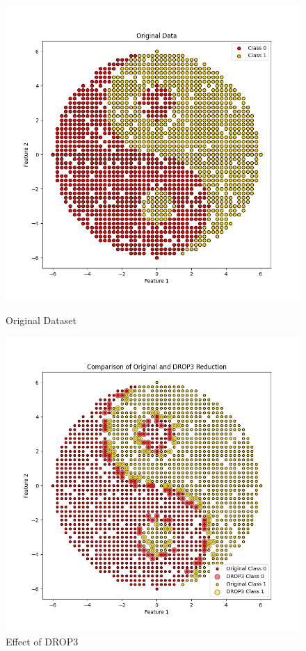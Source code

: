 \begin{enumerate}
	\begin{figure}[ht]
		\centering
		\begin{minipage}{0.45\textwidth}
			\centering
			\includegraphics[width=\textwidth]{figures/DROP3/2dDataset} %
			\caption{Original Dataset}
			\label{fig:2dDataset2}
		\end{minipage}\hfill
		\begin{minipage}{0.45\textwidth}
			\centering
			\includegraphics[width=\textwidth]{figures/DROP3/DROP3} %
			\caption{Effect of DROP3}
			\label{fig:DROp3Total}
		\end{minipage}
	\end{figure}
	
\end{enumerate}
